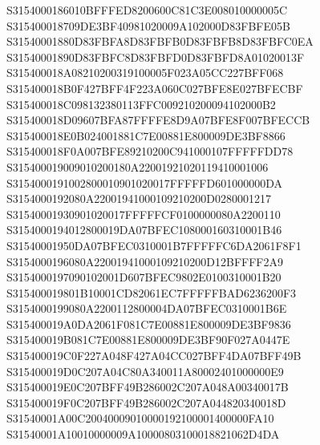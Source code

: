 \documentclass[12pt,a4paper]{article}
\begin{document}
\begin{framed}
{S3154000186010BFFFED8200600C81C3E008010000005C\newline
S315400018709DE3BF40981020009A102000D83FBFE05B\newline
S31540001880D83FBFA8D83FBFB0D83FBFB8D83FBFC0EA\newline
S31540001890D83FBFC8D83FBFD0D83FBFD8A01020013F\newline
S315400018A08210200319100005F023A05CC227BFF068\newline
S315400018B0F427BFF4F223A060C027BFE8E027BFECBF\newline
S315400018C098132380113FFC009210200094102000B2\newline
S315400018D09607BFA87FFFFE8D9A07BFE8F007BFECCB\newline
S315400018E0B024001881C7E00881E800009DE3BF8866\newline
S315400018F0A007BFE89210200C941000107FFFFFDD78\newline
S315400019009010200180A22001921020119410001006\newline
S3154000191002800010901020017FFFFFD601000000DA\newline
S3154000192080A22001941000109210200D0280001217\newline
S31540001930901020017FFFFFCF0100000080A2200110\newline
S3154000194012800019DA07BFEC108000160310001B46\newline
S31540001950DA07BFEC0310001B7FFFFFC6DA2061F8F1\newline
S3154000196080A22001941000109210200D12BFFFF2A9\newline
S3154000197090102001D607BFEC9802E0100310001B20\newline
S315400019801B10001CD82061EC7FFFFFBAD6236200F3\newline
S3154000199080A2200112800004DA07BFEC0310001B6E\newline
S315400019A0DA2061F081C7E00881E800009DE3BF9836\newline
S315400019B081C7E00881E800009DE3BF90F027A0447E\newline
S315400019C0F227A048F427A04CC027BFF4DA07BFF49B\newline
S315400019D0C207A04C80A340011A80002401000000E9\newline
S315400019E0C207BFF49B286002C207A048A00340017B\newline
S315400019F0C207BFF49B286002C207A044820340018D\newline
S31540001A00C20040009010000192100001400000FA10\newline
S31540001A10010000009A10000803100018821062D4DA\newline
}
\end{framed}
\end{document}

